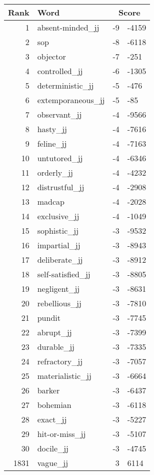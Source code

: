 \begin{longtable}[!htbp]{| rlr@{.}l |}
    \hline
    \textbf{Rank} & \textbf{Word} & \multicolumn{2}{c|}{\textbf{Score}} \\
    \hline
    \endhead
    1 & absent-minded\_jj & -9 & -4159 \\
    2 & sop & -8 & -6118 \\
    3 & objector & -7 & -251 \\
    4 & controlled\_jj & -6 & -1305 \\
    5 & deterministic\_jj & -5 & -476 \\
    6 & extemporaneous\_jj & -5 & -85 \\
    7 & observant\_jj & -4 & -9566 \\
    8 & hasty\_jj & -4 & -7616 \\
    9 & feline\_jj & -4 & -7163 \\
    10 & untutored\_jj & -4 & -6346 \\
    11 & orderly\_jj & -4 & -4232 \\
    12 & distrustful\_jj & -4 & -2908 \\
    13 & madcap & -4 & -2028 \\
    14 & exclusive\_jj & -4 & -1049 \\
    15 & sophistic\_jj & -3 & -9532 \\
    16 & impartial\_jj & -3 & -8943 \\
    17 & deliberate\_jj & -3 & -8912 \\
    18 & self-satisfied\_jj & -3 & -8805 \\
    19 & negligent\_jj & -3 & -8631 \\
    20 & rebellious\_jj & -3 & -7810 \\
    21 & pundit & -3 & -7745 \\
    22 & abrupt\_jj & -3 & -7399 \\
    23 & durable\_jj & -3 & -7335 \\
    24 & refractory\_jj & -3 & -7057 \\
    25 & materialistic\_jj & -3 & -6664 \\
    26 & barker & -3 & -6437 \\
    27 & bohemian & -3 & -6118 \\
    28 & exact\_jj & -3 & -5227 \\
    29 & hit-or-miss\_jj & -3 & -5107 \\
    30 & docile\_jj & -3 & -4745 \\
    1831 & vague\_jj & 3 & 6114 \\

\end{longtable}
